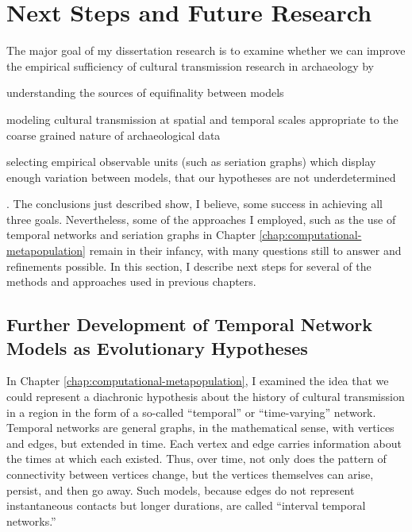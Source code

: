 \section{Next Steps and Future Research}\label{conc:sec:future-research}

The major goal of my dissertation research is to examine whether we can improve the empirical sufficiency of cultural transmission research in archaeology by \begin{dissparalist}
\item understanding the sources of equifinality between models
\item modeling cultural transmission at spatial and temporal scales appropriate to the coarse grained nature of archaeological data
\item selecting empirical observable units (such as seriation graphs) which display enough variation between models, that our hypotheses are not underdetermined
\end{dissparalist}.  The conclusions just described show, I believe, some success in achieving all three goals.  Nevertheless, some of the approaches I employed, such as the use of temporal networks and seriation graphs in Chapter \ref{chap:computational-metapopulation} remain in their infancy, with many questions still to answer and refinements possible.  In this section, I describe next steps for several of the methods and approaches used in previous chapters. 

\subsection{Further Development of Temporal Network Models as Evolutionary Hypotheses}\label{conc:sec:future-temporal-networks}

In Chapter \ref{chap:computational-metapopulation}, I examined the idea that we could represent a diachronic hypothesis about the history of cultural transmission in a region in the form of a so-called ``temporal'' or ``time-varying'' network.  Temporal networks are general graphs, in the mathematical sense, with vertices and edges, but extended in time.  Each vertex and edge carries information about the times at which each existed.  Thus, over time, not only does the pattern of connectivity between vertices change, but the vertices themselves can arise, persist, and then go away.  Such models, because edges do not represent instantaneous contacts but longer durations, are called ``interval temporal networks.''  

